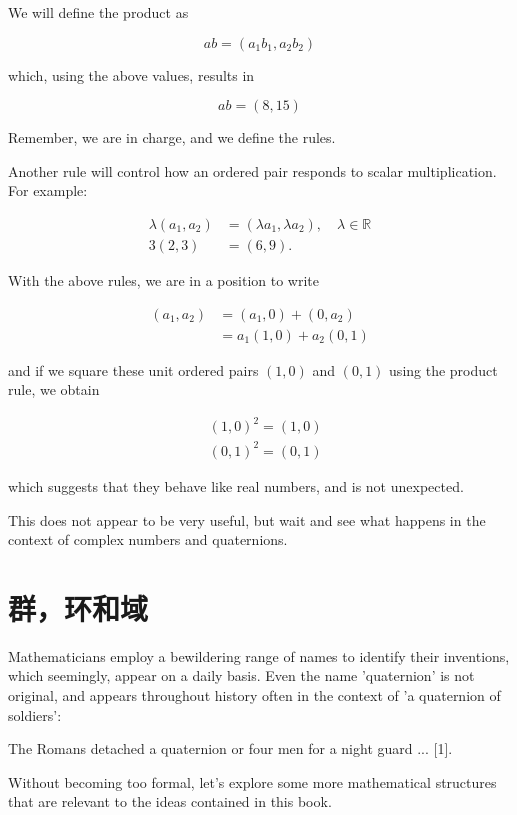 We will define the product as

$$
a b=\left(a_{1} b_{1}, a_{2} b_{2}\right)
$$

which, using the above values, results in

$$
a b=(8,15)
$$

Remember, we are in charge, and we define the rules.

Another rule will control how an ordered pair responds to scalar multiplication. For example:

$$
\begin{aligned}
\lambda\left(a_{1}, a_{2}\right) & =\left(\lambda a_{1}, \lambda a_{2}\right), \quad \lambda \in \mathbb{R} \\
3(2,3) & =(6,9) .
\end{aligned}
$$

With the above rules, we are in a position to write

$$
\begin{aligned}
\left(a_{1}, a_{2}\right) & =\left(a_{1}, 0\right)+\left(0, a_{2}\right) \\
& =a_{1}(1,0)+a_{2}(0,1)
\end{aligned}
$$

and if we square these unit ordered pairs $(1,0)$ and $(0,1)$ using the product rule, we obtain

$$
\begin{aligned}
& (1,0)^{2}=(1,0) \\
& (0,1)^{2}=(0,1)
\end{aligned}
$$

which suggests that they behave like real numbers, and is not unexpected.

This does not appear to be very useful, but wait and see what happens in the context of complex numbers and quaternions.

\section{群，环和域}
Mathematicians employ a bewildering range of names to identify their inventions, which seemingly, appear on a daily basis. Even the name 'quaternion' is not original, and appears throughout history often in the context of 'a quaternion of soldiers':

The Romans detached a quaternion or four men for a night guard ... [1].

Without becoming too formal, let's explore some more mathematical structures that are relevant to the ideas contained in this book.

